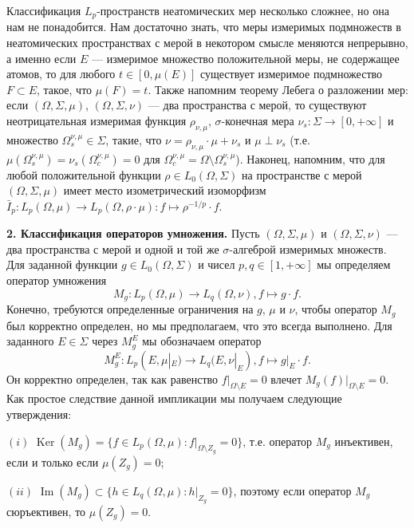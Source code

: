 \documentclass[11pt,twoside]{article}
\begin{document}
Классификация $L_p$-пространств неатомических мер несколько сложнее, но она нам
не понадобится. Нам достаточно знать, что меры измеримых подмножеств в
неатомических пространствах с мерой в некотором смысле меняются непрерывно, а
именно если $E$ --- измеримое множество положительной меры, не содержащее
атомов, то для любого $t\in[0,\mu(E)]$  существует измеримое подмножество
$F\subset E$, такое, что $\mu(F)=t$. Также напомним теорему Лебега о разложении
мер: если $(\Omega,\Sigma,\mu)$, $(\Omega,\Sigma,\nu)$ --- два пространства с
мерой, то существуют неотрицательная измеримая функция $\rho_{\nu,\mu}$,
$\sigma$-конечная мера $\nu_s:\Sigma\to[0,+\infty]$ и множество
$\Omega_s^{\nu,\mu}\in\Sigma$, такие, что $\nu=\rho_{\nu,\mu}\cdot\mu+\nu_s$ и
$\mu\perp\nu_s$ (т.е. $\mu(\Omega_s^{\nu,\mu})=\nu_s(\Omega_c^{\nu,\mu})=0$ для
$\Omega_c^{\nu,\mu}=\Omega\setminus \Omega_s^{\nu,\mu}$). Наконец, напомним, что
для любой положительной функции $\rho\in L_0(\Omega,\Sigma)$ на пространстве с
мерой $(\Omega,\Sigma,\mu)$ имеет место изометрический изоморфизм
$\bar{I}_p:L_p(\Omega,\mu)\to
    L_p(\Omega,\rho\cdot\mu):f\mapsto \rho^{-1/p}\cdot f$.









\textbf{2. Классификация операторов умножения.} Пусть $(\Omega,\Sigma,\mu)$ и
$(\Omega,\Sigma,\nu)$ --- два пространства с мерой и одной и той же
$\sigma$-алгеброй измеримых множеств. Для заданной функции $g\in
    L_0(\Omega,\Sigma)$ и чисел $p,q\in[1,+\infty]$ мы определяем оператор умножения
$$
    M_g:L_p(\Omega,\mu)\to L_q(\Omega,\nu), f\mapsto g\cdot f.
$$
Конечно, требуются определенные ограничения на $g$, $\mu$ и $\nu$, чтобы
оператор $M_g$ был корректно определен, но мы предполагаем, что это всегда
выполнено. Для заданного $E\in\Sigma$ через $M_g^E$ мы обозначаем оператор
$$
    M_g^E:L_p(E,\mu|_E)\to L_q(E,\nu|_E),f\mapsto g|_E\cdot f.
$$
Он корректно определен, так как равенство $f|_{\Omega\setminus E}=0$ влечет
$M_g(f)|_{\Omega\setminus E}=0$. Как простое следствие данной импликации мы
получаем следующие утверждения:

$(i)$ $\operatorname{Ker}(M_g)
    =\{f\in L_p(\Omega,\mu):f|_{\Omega\setminus Z_g}=0\}$, т.е. оператор $M_g$
инъективен, если и только если $\mu(Z_g)=0$;

$(ii)$ $\operatorname{Im}(M_g)\subset \{h\in L_q(\Omega,\mu): h|_{Z_g}=0 \}$,
поэтому если оператор $M_g$ сюръективен, то $\mu(Z_g)=0$.
\end{document}
